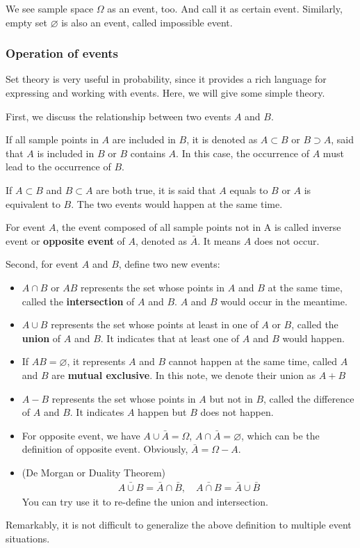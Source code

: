 We see sample space $\Omega$ as an event, too. And call it as certain event. Similarly, empty set $\varnothing$ is also an event, called impossible event.

\subsubsection{Operation of events}

Set theory is very useful in probability, since it provides a rich language for expressing and working with events. Here, we will give some simple theory.

First, we discuss the relationship between two events $A$ and $B$.

If all sample points in $A$ are included in $B$, it is denoted as $A \subset B$ or $B \supset A$, said that $A$ is included in $B$ or $B$ contains $A$. In this case, the occurrence of $A$ must lead to the occurrence of $B$.

If $A\subset B$ and $B\subset A$ are both true, it is said that $A$ equals to $B$ or $A$ is equivalent to $B$. The two events would happen at the same time.

For event $A$, the event composed of all sample points not in A is called inverse event or \textbf{opposite event} of $A$, denoted as $\bar{A}$. It means $A$ does not occur.

Second, for event $A$ and $B$, define two new events:
\begin{itemize}
    \item $A \cap B$ or $AB$ represents the set whose points in $A$ and $B$ at the same time, called the \textbf{intersection} of $A$ and $B$. $A$ and $B$ would occur in the meantime.
    \item $A \cup B$ represents the set whose points at least in one of $A$ or $B$, called the \textbf{union} of $A$ and $B$. It indicates that at least one of $A$ and $B$ would happen.
    \item If $AB=\varnothing$, it represents $A$ and $B$ cannot happen at the same time, called $A$ and $B$ are \textbf{mutual exclusive}. In this note, we denote their union as $A+B$
    \item  $A-B$ represents the set whose points in $A$ but not in $B$, called the difference of $A$ and $B$. It indicates $A$ happen but $B$ does not happen.
    \item For opposite event, we have $A \cup \bar{A} = \Omega$, $A \cap \bar{A}= \varnothing$, which can be the definition of opposite event. Obviously, $\bar{A}=\Omega-A$.
    \item (De Morgan or Duality Theorem) 
    \begin{align*}
        \bar{A\cup B} = \bar{A} \cap \bar{B}, \quad \bar{A\cap B} = \bar{A} \cup \bar{B}
    \end{align*}
    You can try use it to re-define the union and intersection.
\end{itemize}
Remarkably, it is not difficult to generalize the above definition to multiple event situations.

